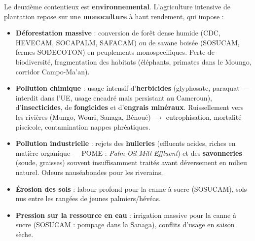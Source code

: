 \documentclass[11pt]{article}
\newcommand{\cle}[1]{{\popxbold\color{popdark}#1}}
\begin{document}
\noindent
Le deuxième contentieux est \textbf{environnemental}. L'agriculture intensive de plantation repose sur une \textbf{monoculture} à haut rendement, qui impose :
\begin{itemize}
    \item \textbf{Déforestation massive} : conversion de forêt dense humide (CDC, HEVECAM, SOCAPALM, SAFACAM) ou de savane boisée (SOSUCAM, fermes SODECOTON) en peuplements monospecifiques. Perte de biodiversité, fragmentation des habitats (éléphants, primates dans le Moungo, corridor Campo-Ma'an).
    \item \textbf{Pollution chimique} : usage intensif d'\textbf{herbicides} (glyphosate, paraquat — interdit dans l'UE, usage encadré mais persistant au Cameroun), d'\textbf{insecticides}, de \textbf{fongicides} et d'\textbf{engrais minéraux}. Ruissellement vers les rivières (Mungo, Wouri, Sanaga, Bénoué) $\rightarrow$ eutrophisation, mortalité piscicole, contamination nappes phréatiques.
    \item \textbf{Pollution industrielle} : rejets des \textbf{huileries} (effluents acides, riches en matière organique — \cle{POME} : \emph{Palm Oil Mill Effluent}) et des \textbf{savonneries} (soude, graisses) souvent insuffisamment traités avant déversement en milieu naturel. Odeurs nauséabondes pour les riverains.
    \item \textbf{Érosion des sols} : labour profond pour la canne à sucre (SOSUCAM), sols nus entre les rangées de jeunes palmiers/hévéas.
    \item \textbf{Pression sur la ressource en eau} : irrigation massive pour la canne à sucre (SOSUCAM : pompage dans la Sanaga), conflits d'usage en saison sèche.
\end{itemize}
\end{document}
